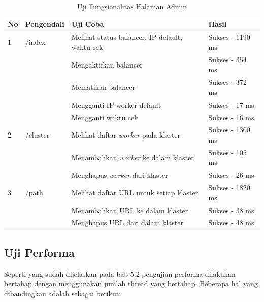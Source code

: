 \documentclass{ta-its}
\begin{document}
					\begin{longtable}{|p{}|p{}|p{}|p{}|} %
						
						\caption{Uji Fungsionalitas Halaman Admin} \label{tabelUjiFungsionalitasHasil} \\
						\hline
						\textbf{No} & \textbf{Pengendali} & \textbf{Uji Coba} & \textbf{Hasil} \\ \hline
						
						\endhead
						\endfoot
						\endlastfoot
						
						
						1 & /index & Melihat status balancer, IP default, waktu cek & Sukses - 1190 ms \\ \cline{3-4}
						&& Mengaktifkan	balancer & Sukses - 354 ms \\ \cline{3-4}
						&& Mematikan balancer & Sukses - 372 ms \\ \cline{3-4}
						&& Mengganti IP worker default & Sukses - 17 ms \\ \cline{3-4}
						&& Mengganti waktu cek & Sukses - 16 ms \\ \hline
						2 & /cluster & Melihat daftar \textit{worker} pada klaster & Sukses - 1300 ms \\ \cline{3-4}
						&& Menambahkan \textit{worker} ke dalam klaster & Sukses - 105 ms \\ \cline{3-4}
						&& Menghapus \textit{worker} dari klaster & Sukses - 26 ms \\ \hline
						3 & /path & Melihat daftar URL untuk setiap klaster & Sukses - 1820 ms \\ \cline{3-4}
						&& Menambahkan URL ke dalam klaster & Sukses - 38 ms \\ \cline{3-4}
						&& Menghapus URL dari dalam klaster & Sukses - 48 ms \\ \hline
						
					\end{longtable}
					
			
			\subsection{Uji Performa}
				Seperti yang sudah dijelaskan pada bab 5.2 pengujian performa dilakukan bertahap dengan menggunakan jumlah thread yang bertahap. Beberapa hal yang dibandingkan adalah sebagai berikut:
				
\end{document}
